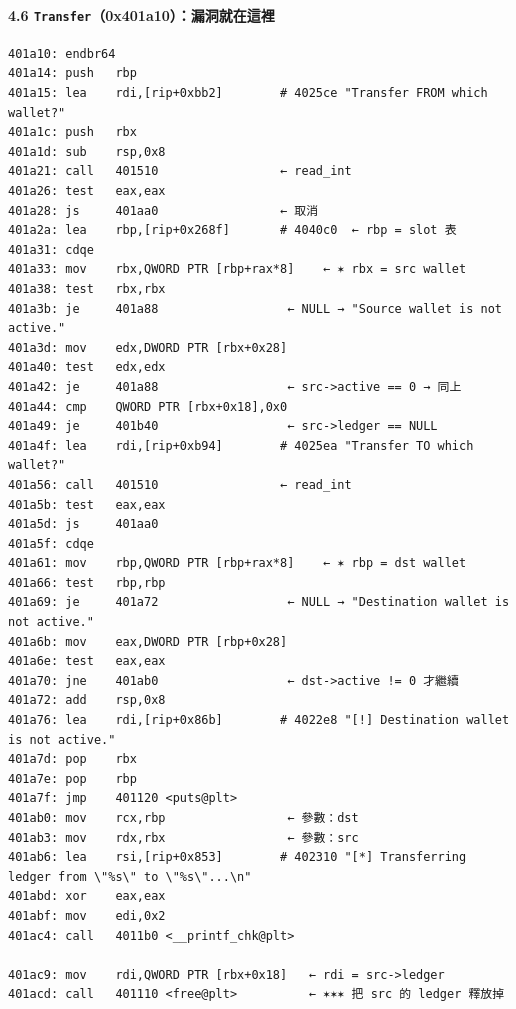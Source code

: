 \documentclass[10pt,a4paper]{article}
\begin{document}
\paragraph{\texorpdfstring{4.6
\texttt{Transfer}（0x401a10）：\textbf{漏洞就在這裡}}{4.6 Transfer（0x401a10）：漏洞就在這裡}}\label{transfer0x401a10ux6f0fux6d1eux5c31ux5728ux9019ux88e1}

\begin{Verbatim}[breaklines=true,breakanywhere=true,breakautoindent=false,fontsize=\fontsize{7.0}{9.5}\selectfont]
401a10: endbr64
401a14: push   rbp
401a15: lea    rdi,[rip+0xbb2]        # 4025ce "Transfer FROM which wallet?"
401a1c: push   rbx
401a1d: sub    rsp,0x8
401a21: call   401510                 ← read_int
401a26: test   eax,eax
401a28: js     401aa0                 ← 取消
401a2a: lea    rbp,[rip+0x268f]       # 4040c0  ← rbp = slot 表
401a31: cdqe
401a33: mov    rbx,QWORD PTR [rbp+rax*8]    ← ✶ rbx = src wallet
401a38: test   rbx,rbx
401a3b: je     401a88                  ← NULL → "Source wallet is not active."
401a3d: mov    edx,DWORD PTR [rbx+0x28]
401a40: test   edx,edx
401a42: je     401a88                  ← src->active == 0 → 同上
401a44: cmp    QWORD PTR [rbx+0x18],0x0
401a49: je     401b40                  ← src->ledger == NULL
401a4f: lea    rdi,[rip+0xb94]        # 4025ea "Transfer TO which wallet?"
401a56: call   401510                 ← read_int
401a5b: test   eax,eax
401a5d: js     401aa0
401a5f: cdqe
401a61: mov    rbp,QWORD PTR [rbp+rax*8]    ← ✶ rbp = dst wallet
401a66: test   rbp,rbp
401a69: je     401a72                  ← NULL → "Destination wallet is not active."
401a6b: mov    eax,DWORD PTR [rbp+0x28]
401a6e: test   eax,eax
401a70: jne    401ab0                  ← dst->active != 0 才繼續
401a72: add    rsp,0x8
401a76: lea    rdi,[rip+0x86b]        # 4022e8 "[!] Destination wallet is not active."
401a7d: pop    rbx
401a7e: pop    rbp
401a7f: jmp    401120 <puts@plt>
401ab0: mov    rcx,rbp                 ← 參數：dst
401ab3: mov    rdx,rbx                 ← 參數：src
401ab6: lea    rsi,[rip+0x853]        # 402310 "[*] Transferring ledger from \"%s\" to \"%s\"...\n"
401abd: xor    eax,eax
401abf: mov    edi,0x2
401ac4: call   4011b0 <__printf_chk@plt>

401ac9: mov    rdi,QWORD PTR [rbx+0x18]   ← rdi = src->ledger
401acd: call   401110 <free@plt>          ← ✶✶✶ 把 src 的 ledger 釋放掉


\end{Verbatim}
\end{document}
